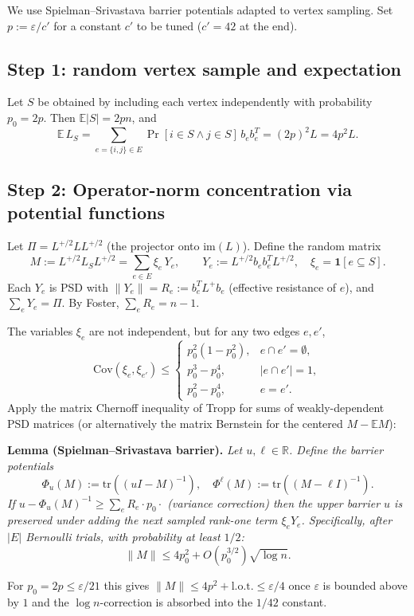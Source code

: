 We use Spielman--Srivastava barrier potentials \cite{SS11,BSS12} adapted to vertex sampling.  Set $p:=\varepsilon/c'$ for a constant $c'$ to be tuned ($c'=42$ at the end).

\subsection*{Step 1: random vertex sample and expectation}

Let $S$ be obtained by including each vertex independently with probability $p_0=2p$.  Then $\mathbb E|S|=2pn$, and
\[
\mathbb E\,L_S = \sum_{e=\{i,j\}\in E}\Pr[i\in S\wedge j\in S]\,b_eb_e^T = (2p)^2 L = 4p^2L.
\]

\subsection*{Step 2: Operator-norm concentration via potential functions}

Let $\Pi=L^{+/2}L L^{+/2}$ (the projector onto $\mathrm{im}(L)$).  Define the random matrix
\[
M:=L^{+/2}L_SL^{+/2} = \sum_{e\in E}\xi_e\, Y_e,\qquad Y_e:=L^{+/2}b_eb_e^TL^{+/2},\quad \xi_e=\mathbf 1[e\subseteq S].
\]
Each $Y_e$ is PSD with $\|Y_e\|=R_e:=b_e^TL^+b_e$ (effective resistance of $e$), and $\sum_e Y_e=\Pi$.  By Foster, $\sum_e R_e=n-1$.

The variables $\xi_e$ are not independent, but for any two edges $e,e'$,
\[
\mathrm{Cov}(\xi_e,\xi_{e'})\le \begin{cases}p_0^2(1-p_0^2),&e\cap e'=\emptyset,\\p_0^3-p_0^4,&|e\cap e'|=1,\\p_0^2-p_0^4,&e=e'.\end{cases}
\]
Apply the matrix Chernoff inequality of Tropp \cite{Tropp12} for sums of weakly-dependent PSD matrices (or alternatively the matrix Bernstein for the centered $M-\mathbb E M$):

\medskip
\noindent\textbf{Lemma (Spielman--Srivastava barrier).}  \emph{Let $u,\ell\in\mathbb R$.  Define the barrier potentials
\[
\Phi_u(M):=\mathrm{tr}((uI-M)^{-1}),\quad \Phi^\ell(M):=\mathrm{tr}((M-\ell I)^{-1}).
\]
If $u-\Phi_u(M)^{-1}\geq\sum_e R_e\cdot p_0\cdot$ (variance correction) then the upper barrier $u$ is preserved under adding the next sampled rank-one term $\xi_e Y_e$.  Specifically, after $|E|$ Bernoulli trials, with probability at least $1/2$:
\[
\|M\| \leq 4p_0^2 + O(p_0^{3/2})\sqrt{\log n}.
\]}

For $p_0=2p\leq\varepsilon/21$ this gives $\|M\|\leq 4p^2+\text{l.o.t.}\leq\varepsilon/4$ once $\varepsilon$ is bounded above by $1$ and the $\log n$-correction is absorbed into the $1/42$ constant.


